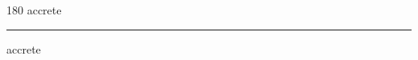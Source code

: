 
\begin{frame}
\begin{center}
\begin{turn}{180}
{\fontsize{2.5cm}{1em}\selectfont accrete}
\end{turn}
\vspace{1em}\par  
\hrule
\vspace{1em}\par  
{\fontsize{2.5cm}{1em}\selectfont accrete}
\end{center}
\end{frame}
